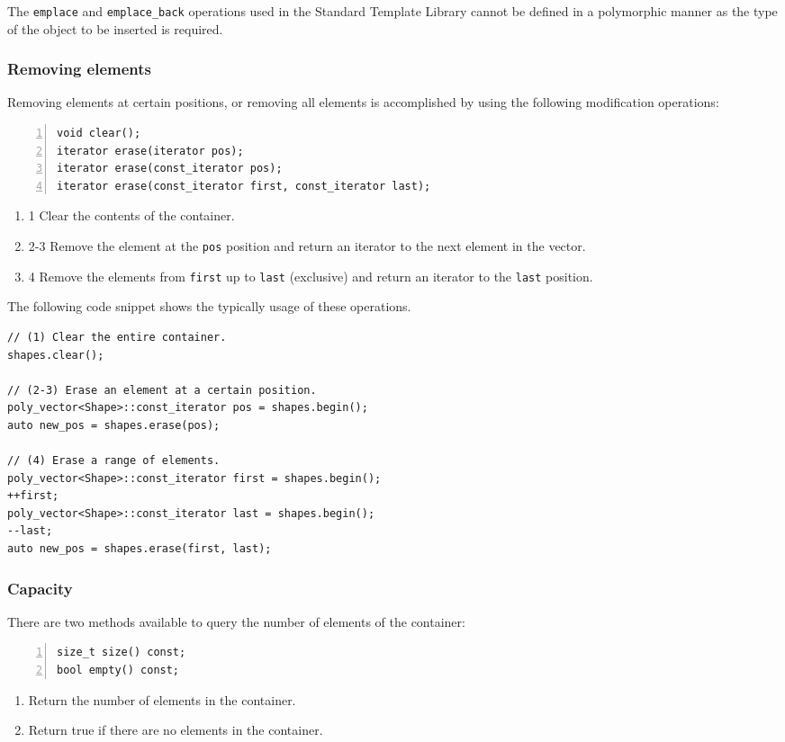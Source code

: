 \documentclass[10pt,a4paper,openany]{mudbook}
\newenvironment{enumeratedef}
  {\begin{enumerate}[topsep=0.5em,itemsep=0em,parsep=0em,font=\small]
     \small}
  {\end{enumerate}}
\begin{document}
The \texttt{emplace} and \texttt{emplace\_back} operations used in the
Standard Template Library cannot be defined in a polymorphic manner as the type
of the object to be inserted is required.

\subsubsection{Removing elements}

Removing elements at certain positions, or removing all elements is
accomplished by using the following modification operations:
\begin{lstlisting}[style=definition,numbers=left]
void clear();
iterator erase(iterator pos);
iterator erase(const_iterator pos);
iterator erase(const_iterator first, const_iterator last);
\end{lstlisting}
\begin{enumeratedef}
  \item[1] Clear the contents of the container.
  \item[2-3] Remove the element at the \texttt{pos} position and return an
           iterator to the next element in the vector. 
  \item[4] Remove the elements from \texttt{first} up to \texttt{last}
           (exclusive) and return an iterator to the \texttt{last} position.    
\end{enumeratedef}

The following code snippet shows the typically usage of these operations.

\begin{lstlisting}[style=snippet]
// (1) Clear the entire container.
shapes.clear();

// (2-3) Erase an element at a certain position.
poly_vector<Shape>::const_iterator pos = shapes.begin();
auto new_pos = shapes.erase(pos);

// (4) Erase a range of elements.
poly_vector<Shape>::const_iterator first = shapes.begin();
++first;
poly_vector<Shape>::const_iterator last = shapes.begin();
--last;
auto new_pos = shapes.erase(first, last);
\end{lstlisting}

\subsubsection{Capacity}

There are two methods available to query the number of elements of the
container:
\begin{lstlisting}[style=definition,numbers=left]
size_t size() const;
bool empty() const;
\end{lstlisting}
\begin{enumeratedef}
  \item Return the number of elements in the container.
  \item Return true if there are no elements in the container.
\end{enumeratedef}
\end{document}
